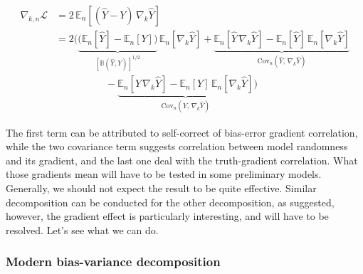 \documentclass[10pt]{article}
\begin{document}
\begin{align}
    \nabla_{k,n}\mathcal{L}
    &= 2\,\mathbb{E}_n\!\left[(\hat Y - Y)\,\nabla_k \hat Y\right] \\
    &= 2\Bigg(
    \underset{\left[\mathbb{B}(\hat{Y},Y)\right]^{1/2}}{\underbrace{\bigl(\mathbb{E}_n[\hat Y] - \mathbb{E}_n[Y]\bigr)}}\,\mathbb{E}_n[\nabla_k \hat Y]
    + \underset{\mathrm{Cov}_n(\hat Y,\,\nabla_k \hat Y)}{\underbrace{\mathbb{E}_n[\hat Y\,\nabla_k \hat Y] - \mathbb{E}_n[\hat Y]\,\mathbb{E}_n[\nabla_k \hat Y]}}
     \\
    & \quad \quad \quad \quad \quad -\underset{\mathrm{Cov}_n(Y,\,\nabla_k \hat Y)}{\underbrace{\mathbb{E}_n[Y\,\nabla_k \hat Y] - \mathbb{E}_n[Y]\,\mathbb{E}_n[\nabla_k \hat Y]}}
    \Bigg)
\end{align}

The first term can be attributed to self-correct of bias-error gradient correlation, while the two covariance term suggests correlation between model randomness and its gradient, and the last one deal with the truth-gradient correlation. What those gradients mean will have to be tested in some preliminary models. Generally, we should not expect the result to be quite effective. Similar decomposition can be conducted for the other decomposition, as suggested, however, the gradient effect is particularly interesting, and will have to be resolved. Let's see what we can do. 



\subsubsection{Modern bias-variance decomposition}
\end{document}
